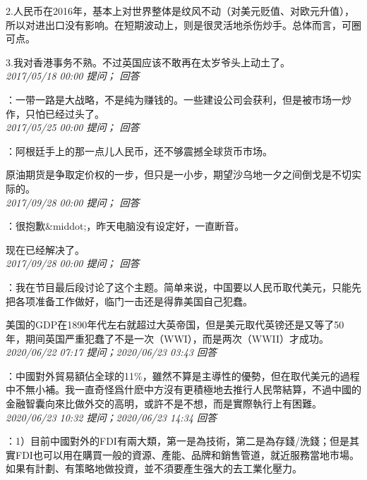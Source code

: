 \documentclass[twocolumn]{ctexart}
\begin{document}
2.人民币在2016年，基本上对世界整体是纹风不动（对美元贬值、对欧元升值），所以对进出口没有影响。在短期波动上，则是很灵活地杀伤炒手。总体而言，可圈可点。

3.我对香港事务不熟。不过英国应该不敢再在太岁爷头上动土了。\\

\textit{\hfill\noindent\small 2017/05/18 00:00 提问； 回答}

：一带一路是大战略，不是纯为赚钱的。一些建设公司会获利，但是被市场一炒作，只怕已经过头了。\\

\textit{\hfill\noindent\small 2017/05/25 00:00 提问； 回答}

：阿根廷手上的那一点儿人民币，还不够震撼全球货币市场。

原油期货是争取定价权的一步，但只是一小步，期望沙乌地一夕之间倒戈是不切实际的。\\

\textit{\hfill\noindent\small 2017/09/28 00:00 提问； 回答}

：很抱歉\&middot;，昨天电脑没有设定好，一直断音。

现在已经解决了。\\

\textit{\hfill\noindent\small 2017/09/28 00:00 提问； 回答}

：我在节目最后段讨论了这个主题。简单来说，中国要以人民币取代美元，只能先把各项准备工作做好，临门一击还是得靠美国自己犯蠢。

美国的GDP在1890年代左右就超过大英帝国，但是美元取代英镑还是又等了50年，期间英国严重犯蠢了不是一次（WWI），而是两次（WWII）才成功。\\

\textit{\hfill\noindent\small 2020/06/22 07:17 提问；2020/06/23 03:43 回答}

：中國對外貿易額佔全球的11\%，雖然不算是主導性的優勢，但在取代美元的過程中不無小補。我一直奇怪爲什麽中方沒有更積極地去推行人民幣結算，不過中國的金融智囊向來比做外交的高明，或許不是不想，而是實際執行上有困難。
\\

\textit{\hfill\noindent\small 2020/06/23 10:32 提问；2020/06/23 14:34 回答}

：1）目前中國對外的FDI有兩大類，第一是為技術，第二是為存錢/洗錢；但是其實FDI也可以用在購買一般的資源、產能、品牌和銷售管道，就近服務當地市場。如果有計劃、有策略地做投資，並不須要產生强大的去工業化壓力。
\end{document}
